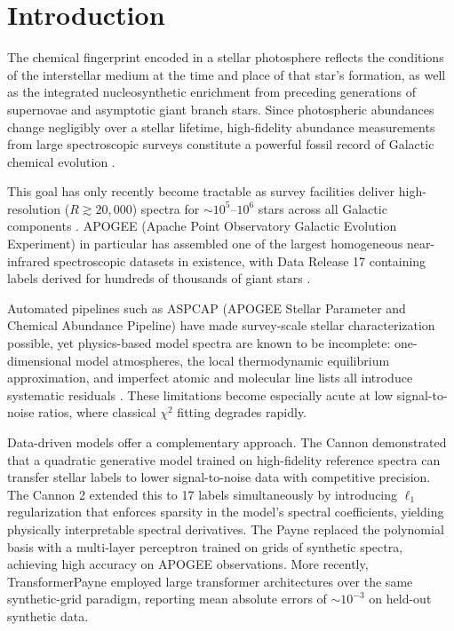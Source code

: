 \documentclass[preprint]{aastex701-1/aastex701}
\begin{document}

\section{Introduction}
\label{sec:intro}

The chemical fingerprint encoded in a stellar photosphere reflects the conditions of the
interstellar medium at the time and place of that star's formation, as well as the integrated
nucleosynthetic enrichment from preceding generations of supernovae and asymptotic giant
branch stars. Since photospheric abundances change negligibly over a stellar lifetime,
high-fidelity abundance measurements from large spectroscopic surveys constitute a powerful
fossil record of Galactic chemical evolution \citep{Freeman2002,BlandHawthorn2016}.

This goal has only recently become tractable as survey facilities deliver high-resolution
($R \gtrsim 20{,}000$) spectra for $\sim 10^5$--$10^6$ stars across all Galactic components
\citep{Majewski2017}. APOGEE (Apache Point Observatory Galactic Evolution Experiment)
in particular has assembled one of the largest homogeneous near-infrared spectroscopic
datasets in existence, with Data Release 17 containing labels derived for hundreds of
thousands of giant stars \citep{Abdurrouf2022}.

Automated pipelines such as ASPCAP (APOGEE Stellar Parameter and Chemical Abundance
Pipeline) have made survey-scale stellar characterization possible, yet physics-based model
spectra are known to be incomplete: one-dimensional model atmospheres, the local
thermodynamic equilibrium approximation, and imperfect atomic and molecular line lists
all introduce systematic residuals \citep{GarciaperezASPCAP2016}. These limitations become
especially acute at low signal-to-noise ratios, where classical $\chi^2$ fitting degrades
rapidly.

Data-driven models offer a complementary approach. The Cannon \citep{Ness2015Cannon}
demonstrated that a quadratic generative model trained on high-fidelity reference spectra
can transfer stellar labels to lower signal-to-noise data with competitive precision. The
Cannon 2 \citep{Casey2016Cannon2} extended this to 17 labels simultaneously by introducing
$\ell_1$ regularization that enforces sparsity in the model's spectral coefficients, yielding
physically interpretable spectral derivatives. The Payne \citep{Ting2019Payne} replaced the
polynomial basis with a multi-layer perceptron trained on grids of synthetic spectra,
achieving high accuracy on APOGEE observations. More recently, TransformerPayne
\citep{TransformerPayne2025} employed large transformer architectures over the same
synthetic-grid paradigm, reporting mean absolute errors of $\sim 10^{-3}$ on held-out
synthetic data.
\end{document}
